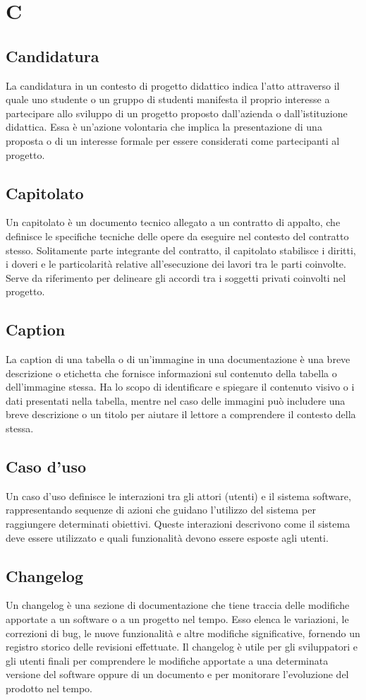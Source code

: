 \section*{C} 
\subsection*{Candidatura} 
La candidatura in un contesto di progetto didattico indica l'atto attraverso il quale uno studente o un gruppo di studenti manifesta il proprio interesse a partecipare allo sviluppo di un progetto proposto dall'azienda o dall'istituzione didattica. Essa è un'azione volontaria che implica la presentazione di una proposta o di un interesse formale per essere considerati come partecipanti al progetto.
\subsection*{Capitolato} 
Un capitolato è un documento tecnico allegato a un contratto di appalto, che definisce le specifiche tecniche delle opere da eseguire nel contesto del contratto stesso. Solitamente parte integrante del contratto, il capitolato stabilisce i diritti, i doveri e le particolarità relative all'esecuzione dei lavori tra le parti coinvolte. Serve da riferimento per delineare gli accordi tra i soggetti privati coinvolti nel progetto.
\subsection*{Caption} 
La caption di una tabella o di un'immagine in una documentazione è una breve descrizione o etichetta che fornisce informazioni sul contenuto della tabella o dell'immagine stessa. Ha lo scopo di identificare e spiegare il contenuto visivo o i dati presentati nella tabella, mentre nel caso delle immagini può includere una breve descrizione o un titolo per aiutare il lettore a comprendere il contesto della stessa.
\subsection*{Caso d'uso} 
Un caso d'uso definisce le interazioni tra gli attori (utenti) e il sistema software, rappresentando sequenze di azioni che guidano l'utilizzo del sistema per raggiungere determinati obiettivi. Queste interazioni descrivono come il sistema deve essere utilizzato e quali funzionalità devono essere esposte agli utenti.
\subsection*{Changelog} 
Un changelog è una sezione di documentazione che tiene traccia delle modifiche apportate a un software o a un progetto nel tempo. Esso elenca le variazioni, le correzioni di bug, le nuove funzionalità e altre modifiche significative, fornendo un registro storico delle revisioni effettuate. Il changelog è utile per gli sviluppatori e gli utenti finali per comprendere le modifiche apportate a una determinata versione del software oppure di un documento e per monitorare l'evoluzione del prodotto nel tempo.
